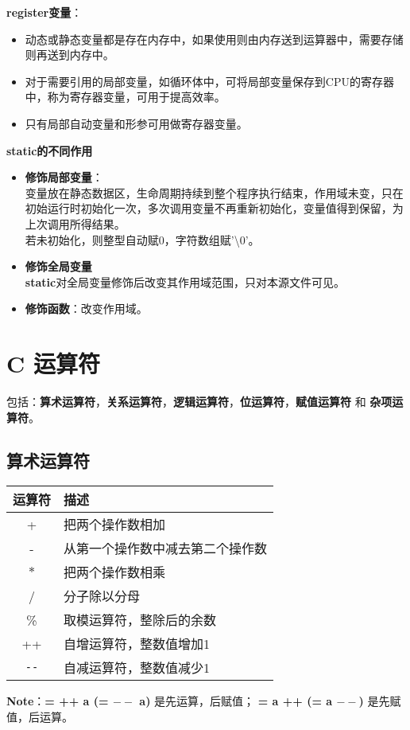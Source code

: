 \documentclass[UTF8]{ctexart}
\begin{document}
\begin{framed}
\begin{itemize}
		\end{itemize}
		\textbf{register变量}：\begin{itemize}
			\item 动态或静态变量都是存在内存中，如果使用则由内存送到运算器中，需要存储则再送到内存中。
			\item 对于需要引用的局部变量，如循环体中，可将局部变量保存到CPU的寄存器中，称为寄存器变量，可用于提高效率。
			\item 只有局部自动变量和形参可用做寄存器变量。
		\end{itemize}
		\textbf{static的不同作用}
		\begin{itemize}
			\item \textbf{修饰局部变量}：\\变量放在静态数据区，生命周期持续到整个程序执行结束，作用域未变，只在初始运行时初始化一次，多次调用变量不再重新初始化，变量值得到保留，为上次调用所得结果。\\若未初始化，则整型自动赋0，字符数组赋'\textbackslash 0'。
			\item \textbf{修饰全局变量}\\ \textbf{static}对全局变量修饰后改变其作用域范围，只对本源文件可见。
			\item \textbf{修饰函数}：改变作用域。
		\end{itemize}
	\end{framed}

	\clearpage
	\section{C 运算符}
	包括：\textbf{算术运算符}，\textbf{关系运算符}，\textbf{逻辑运算符}，\textbf{位运算符}，\textbf{赋值运算符} 和 \textbf{杂项运算符}。
	\subsection{算术运算符}
	\begin{tabular*}{\linewidth}{c|l}
		\toprule
		运算符 & 描述\\
		\midrule
		+ & 把两个操作数相加\\
		- & 从第一个操作数中减去第二个操作数\\
		$*$ & 把两个操作数相乘\\
		/ & 分子除以分母\\
		\% & 取模运算符，整除后的余数\\
		++ & 自增运算符，整数值增加1\\
		\verb|--| & 自减运算符，整数值减少1\\
		\bottomrule 
	\end{tabular*}
	\textbf{Note}：\textbf{= ++ a (= $--$ a)} 是先运算，后赋值； \textbf{= a ++ (= a $--$)} 是先赋值，后运算。
\end{document}
